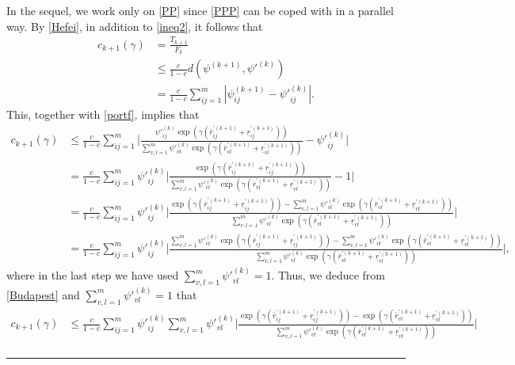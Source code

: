 \documentclass[11pt]{article}
\newcommand{\fin}{\hspace*{\fill}\rule{0.3em}{1ex}}
\newenvironment{proof}{{\bf \noindent Proof.}}{\fin}
\numberwithin{equation}{section}
\begin{document}
\begin{proof}
In the sequel, we work only on \eqref{PP} since \eqref{PPP} can be coped with in a parallel way. By \eqref{Hefei}, in addition to \eqref{ineq2}, it follows that 
\begin{equation*}
\begin{split}
c_{k+1}(\gamma)&=\frac{T_{k+1}}{F_k}\\
&\le \frac{c}{1-c}d(\psi^{(k+1)}, {\psi'}^{(k)})\\
&= \frac{c}{1-c}\sum_{ij=1}^{m}|\psi^{(k+1)}_{ij}-\psi'^{(k)}_{ij}|.
\end{split}
\end{equation*}
This, together with \eqref{portf},  implies that 
\begin{equation*}
\begin{split}
c_{k+1}(\gamma)&\le\frac{c}{1-c}\sum_{ij=1}^{m}\bigg|\frac{\psi'^{(k)}_{ij}\exp(\gamma (\bar r_{ij}^{'(k+1)}+\underline r_{ij}^{'(k+1)}))}{\sum_{v,l=1}^{m}\psi'^{(k)}_{vl}\exp(\gamma (\bar r_{vl}^{'(k+1)}+\underline r_{vl}^{'(k+1)}))}-\psi'^{(k)}_{ij}\bigg|\\
&=\frac{c}{1-c}\sum_{ij=1}^{m}\psi'^{(k)}_{ij}\bigg|\frac{\exp(\gamma (\bar r_{ij}^{'(k+1)}+\underline r_{ij}^{'(k+1)}))}{\sum_{v,l=1}^{m}\psi'^{(k)}_{vl}\exp(\gamma (\bar r_{vl}^{'(k+1)}+\underline r_{vl}^{'(k+1)}))}-1\bigg|\\
&=\frac{c}{1-c}\sum_{ij=1}^{m}\psi'^{(k)}_{ij}\bigg|\frac{\exp(\gamma (\bar r_{ij}^{'(k+1)}+\underline r_{ij}^{'(k+1)}))-\sum_{v,l=1}^{m}\psi'^{(k)}_{vl}\exp(\gamma (\bar r_{vl}^{'(k+1)}+\underline r_{vl}^{'(k+1)}))}{\sum_{v,l=1}^{m}\psi'^{(k)}_{vl}\exp(\gamma (\bar r_{vl}^{'(k+1)}+\underline r_{vl}^{'(k+1)}))}\bigg|\\
&=\frac{c}{1-c}\sum_{ij=1}^{m}\psi'^{(k)}_{ij}\bigg|\frac{\sum_{v,l=1}^{m}\psi'^{(k)}_{vl}  \exp(\gamma (\bar r_{ij}^{'(k+1)}+\underline r_{ij}^{'(k+1)}))-\sum_{v,l=1}^{m}\psi'^{(k)}_{vl}\exp(\gamma (\bar r_{vl}^{'(k+1)}+\underline r_{vl}^{'(k+1)}))}{\sum_{v,l=1}^{m}\psi'^{(k)}_{vl}\exp(\gamma (\bar r_{vl}^{'(k+1)}+\underline r_{vl}^{'(k+1)}))}\bigg|,
\end{split}
\end{equation*}
where in the last step we have used $\sum_{v,l=1}^{m}\psi'^{(k)}_{vl}=1$. Thus, we deduce from \eqref{Budapest} and $\sum_{v,l=1}^{m}\psi'^{(k)}_{vl}=1$ that 
 \begin{equation}\label{Way}
\begin{split}
c_{k+1}(\gamma)&\le\frac{c}{1-c}\sum_{ij=1}^{m}\psi'^{(k)}_{ij}\sum_{v,l=1}^{m}\psi'^{(k)}_{vl} \bigg|\frac{ \exp(\gamma (\bar r_{ij}^{'(k+1)}+\underline r_{ij}^{'(k+1)}))-\exp(\gamma (\bar r_{vl}^{'(k+1)}+\underline r_{vl}^{'(k+1)}))}{\sum_{v,l=1}^{m}\psi'^{(k)}_{vl}\exp(\gamma (\bar r_{vl}^{'(k+1)}+\underline r_{vl}^{'(k+1)}))}\bigg|\\

\end{split}
\end{equation}
\end{proof}
\end{document}
